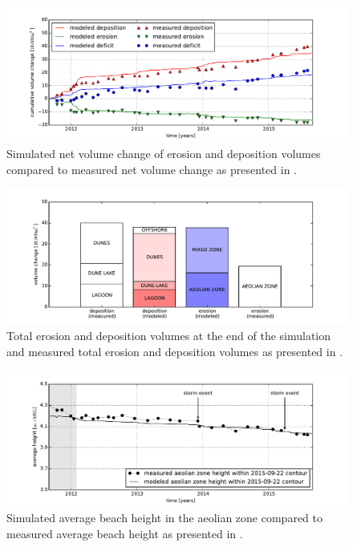 \documentclass[preprint,12pt,authoryear]{elsarticle}
\begin{document}
\begin{figure}
  \centering
\includegraphics[width=\columnwidth]{model_volumes_ts}
\caption{Simulated net volume change of erosion and deposition volumes
  compared to measured net volume change as presented in
  \citet{Hoonhout2017a}.}
  \label{fig:netvolumechange_model}
\end{figure}

\begin{figure}
  \centering
  \includegraphics[width=\columnwidth]{model_volumes}
  \caption{Total erosion and deposition volumes at the end of the
    simulation and measured total erosion and deposition volumes as
    presented in \citet{Hoonhout2017a}.}
  \label{fig:volumes_bars_model}
\end{figure}

\begin{figure}
  \centering
  \includegraphics[width=\columnwidth]{model_heights}
  \caption{Simulated average beach height in the aeolian zone compared
    to measured average beach height as presented in
    \citet{Hoonhout2017a}.}
  \label{fig:heights_model}
\end{figure}
\end{document}
